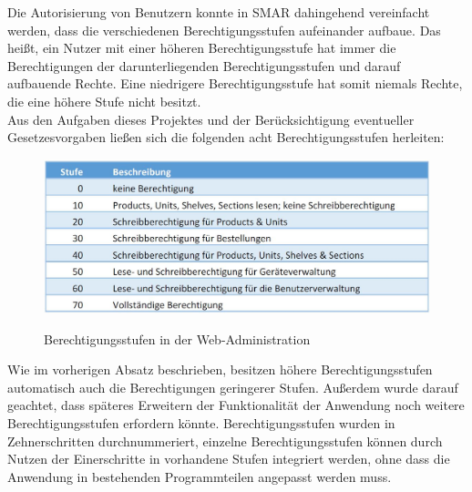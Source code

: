 Die Autorisierung von Benutzern konnte in \acs{SMAR} dahingehend vereinfacht werden, dass die verschiedenen Berechtigungsstufen aufeinander aufbaue. Das heißt, ein Nutzer mit einer höheren Berechtigungsstufe hat immer die Berechtigungen der darunterliegenden Berechtigungsstufen und darauf aufbauende Rechte. Eine niedrigere Berechtigungsstufe hat somit niemals Rechte, die eine höhere Stufe nicht besitzt.\\

Aus den Aufgaben dieses Projektes und der Berücksichtigung eventueller Gesetzesvorgaben ließen sich die folgenden acht Berechtigungsstufen herleiten:
\begin{figure}[H]
	\centering
	{\includegraphics[scale=0.5]{Bilder/role_web.jpg}}
	\caption{Berechtigungsstufen in der Web-Administration}
	\label{fig:role_web}
\end{figure}
Wie im vorherigen Absatz beschrieben, besitzen höhere Berechtigungsstufen automatisch auch die Berechtigungen geringerer Stufen. Außerdem wurde darauf geachtet, dass späteres Erweitern der Funktionalität der Anwendung noch weitere Berechtigungsstufen erfordern könnte. Berechtigungsstufen wurden in Zehnerschritten durchnummeriert, einzelne Berechtigungsstufen können durch Nutzen der Einerschritte in vorhandene Stufen integriert werden, ohne dass die Anwendung in bestehenden Programmteilen angepasst werden muss.\\

